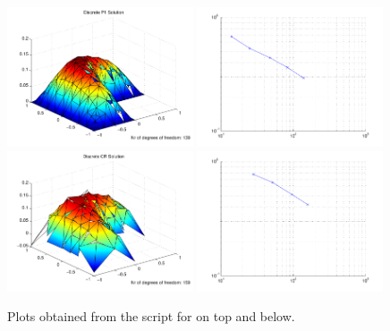 \begin{figure}[ht!]
\includegraphics[width= 0.49\textwidth]{images/sect_QuickStart_LShapeU1}
\includegraphics[width= 0.49\textwidth]{images/sect_QuickStart_LShapeE1}\\
\includegraphics[width= 0.49\textwidth]{images/sect_QuickStart_LShapeU2}
\includegraphics[width= 0.49\textwidth]{images/sect_QuickStart_LShapeE2}
\caption{Plots obtained from the  script for  on top and  below.}\label{sect:Quickstart.fig.plots.gettingStarted}
\end{figure}

